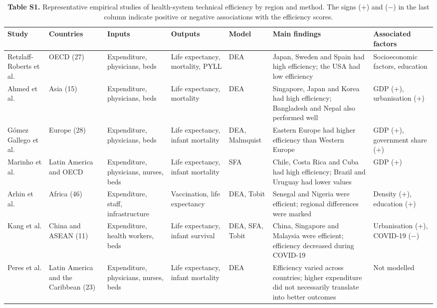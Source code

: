 \documentclass[11pt,letterpaper]{article}
\begin{document}
\begin{table}[htbp]
\footnotesize
\caption{\textbf{Table S1.} Representative empirical studies of health-system technical efficiency by region and method. The signs (+) and ($-$) in the last column indicate positive or negative associations with the efficiency scores.}
\begin{tabularx}{\textwidth}{@{}L{2.6cm}L{2.1cm}XXL{1.7cm}XL{2.4cm}@{}}
\toprule
\textbf{Study} & \textbf{Countries} & \textbf{Inputs} & \textbf{Outputs} & \textbf{Model} & \textbf{Main findings} & \textbf{Associated factors} \\
\midrule
Retzlaff-Roberts et al.\citep{retzlaff2004} & OECD (27) & Expenditure, physicians, beds & Life expectancy, mortality, PYLL & DEA & Japan, Sweden and Spain had high efficiency; the USA had low efficiency & Socioeconomic factors, education \\
Ahmed et al.\citep{ahmed2019} & Asia (15) & Expenditure, physicians, beds & Life expectancy, mortality & DEA & Singapore, Japan and Korea had high efficiency; Bangladesh and Nepal also performed well & GDP (+), urbanisation (+) \\
Gómez Gallego et al.\citep{gomezgallego2019} & Europe (28) & Expenditure, physicians, beds & Life expectancy, infant mortality & DEA, Malmquist & Eastern Europe had higher efficiency than Western Europe & GDP (+), government share (+) \\
Marinho et al.\citep{marinho2020} & Latin America and OECD & Expenditure, physicians, nurses, beds & Life expectancy, infant mortality & SFA & Chile, Costa Rica and Cuba had high efficiency; Brazil and Uruguay had lower values & GDP (+) \\
Arhin et al.\citep{arhin2023} & Africa (46) & Expenditure, staff, infrastructure & Vaccination, life expectancy & DEA, Tobit & Senegal and Nigeria were efficient; regional differences were marked & Density (+), education (+) \\
Kang et al.\citep{kang2023} & China and ASEAN (11) & Expenditure, health workers, beds & Life expectancy, infant survival & DEA, SFA, Tobit & China, Singapore and Malaysia were efficient; efficiency decreased during COVID-19 & Urbanisation (+), COVID-19 ($-$) \\
Peres et al.\citep{peres2025} & Latin America and the Caribbean (23) & Expenditure, physicians, nurses, beds & Life expectancy, infant mortality & DEA & Efficiency varied across countries; higher expenditure did not necessarily translate into better outcomes & Not modelled \\
\bottomrule
\end{tabularx}
\end{table}
\end{document}
